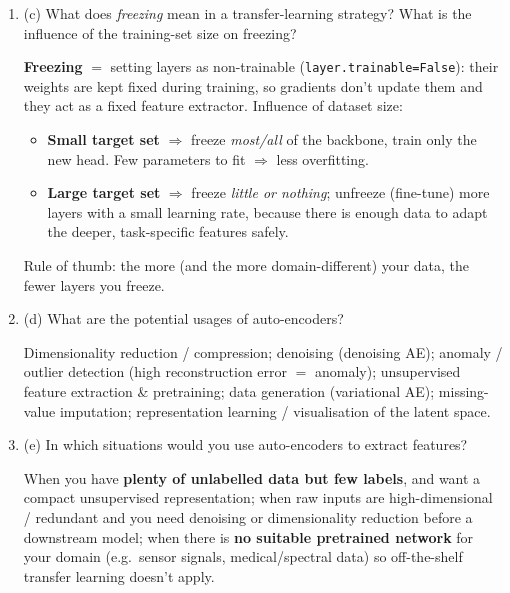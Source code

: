 \documentclass[10pt,a4paper]{article}
\newcommand{\q}[1]{\item #1}
\begin{document}
\begin{enumerate}[leftmargin=*,label=\textbf{Q\arabic*.}]
\q (c) What does \emph{freezing} mean in a transfer-learning strategy? What is the influence of the training-set size on freezing?
\begin{answerbox}
\textbf{Freezing} $=$ setting layers as non-trainable (\texttt{layer.trainable=False}): their weights are kept fixed during training, so gradients don't update them and they act as a fixed feature extractor. Influence of dataset size:
\begin{itemize}[leftmargin=1.2em]
  \item \textbf{Small target set} $\Rightarrow$ freeze \emph{most/all} of the backbone, train only the new head. Few parameters to fit $\Rightarrow$ less overfitting.
  \item \textbf{Large target set} $\Rightarrow$ freeze \emph{little or nothing}; unfreeze (fine-tune) more layers with a small learning rate, because there is enough data to adapt the deeper, task-specific features safely.
\end{itemize}
Rule of thumb: the more (and the more domain-different) your data, the fewer layers you freeze.
\end{answerbox}

\q (d) What are the potential usages of auto-encoders?
\begin{answerbox}
Dimensionality reduction / compression; denoising (denoising AE); anomaly / outlier detection (high reconstruction error $=$ anomaly); unsupervised feature extraction \& pretraining; data generation (variational AE); missing-value imputation; representation learning / visualisation of the latent space.
\end{answerbox}

\q (e) In which situations would you use auto-encoders to extract features?
\begin{answerbox}
When you have \textbf{plenty of unlabelled data but few labels}, and want a compact unsupervised representation; when raw inputs are high-dimensional / redundant and you need denoising or dimensionality reduction before a downstream model; when there is \textbf{no suitable pretrained network} for your domain (e.g.\ sensor signals, medical/spectral data) so off-the-shelf transfer learning doesn't apply.
\end{answerbox}


\end{enumerate}
\end{document}
